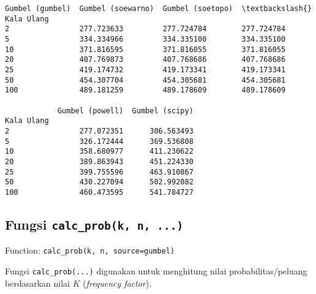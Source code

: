 \documentclass[11pt]{article}
\makeatletter
\newcommand{\boxspacing}{\kern\kvtcb@left@rule\kern\kvtcb@boxsep}
\newcommand{\prompt}[4]{
        {\ttfamily\llap{{\color{#2}[#3]:\hspace{3pt}#4}}\vspace{-\baselineskip}}
    }
\makeatother
\begin{document}
            \begin{tcolorbox}[breakable, size=fbox, boxrule=.5pt, pad at break*=1mm, opacityfill=0]
\prompt{Out}{outcolor}{ }{\boxspacing}
\begin{Verbatim}[commandchars=\\\{\}]
            Gumbel (gumbel)  Gumbel (soewarno)  Gumbel (soetopo)  \textbackslash{}
Kala Ulang
2                277.723633         277.724784        277.724784
5                334.334966         334.335100        334.335100
10               371.816595         371.816055        371.816055
20               407.769873         407.768686        407.768686
25               419.174732         419.173341        419.173341
50               454.307704         454.305681        454.305681
100              489.181259         489.178609        489.178609

            Gumbel (powell)  Gumbel (scipy)
Kala Ulang
2                277.072351      306.563493
5                326.172444      369.536808
10               358.680977      411.230622
20               389.863943      451.224330
25               399.755596      463.910867
50               430.227094      502.992082
100              460.473595      541.784727
\end{Verbatim}
\end{tcolorbox}
        
    \hypertarget{fungsi-calc_probk-n-...}{%
\subsection{\texorpdfstring{Fungsi
\texttt{calc\_prob(k,\ n,\ ...)}}{Fungsi calc\_prob(k, n, ...)}}\label{fungsi-calc_probk-n-...}}

Function:
\texttt{calc\_prob(k,\ n,\ source=\textquotesingle{}gumbel\textquotesingle{})}

Fungsi \texttt{calc\_prob(...)} digunakan untuk menghitung nilai
probabilitas/peluang berdasarkan nilai \(K\) (\emph{frequency factor}).
\end{document}
